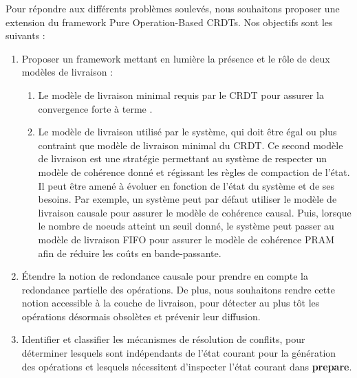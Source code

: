 Pour répondre aux différents problèmes soulevés, nous souhaitons proposer une extension du framework Pure Operation-Based \acp{CRDT}.
Nos objectifs sont les suivants :
\begin{enumerate}
    \item Proposer un framework mettant en lumière la présence et le rôle de deux modèles de livraison :
        \begin{enumerate}
            \item Le modèle de livraison minimal requis par le \ac{CRDT} pour assurer la convergence forte à terme \cite{shapiro_2011_crdt}.
            \item Le modèle de livraison utilisé par le système, qui doit être égal ou plus contraint que modèle de livraison minimal du \ac{CRDT}.
                Ce second modèle de livraison est une stratégie permettant au système de respecter un modèle de cohérence donné et régissant les règles de compaction de l'état.
                Il peut être amené à évoluer en fonction de l'état du système et de ses besoins.
                Par exemple, un système peut par défaut utiliser le modèle de livraison causale pour assurer le modèle de cohérence causal.
                Puis, lorsque le nombre de noeuds atteint un seuil donné, le système peut passer au modèle de livraison FIFO pour assurer le modèle de cohérence PRAM afin de réduire les coûts en bande-passante.
        \end{enumerate}
    \item Étendre la notion de redondance causale pour prendre en compte la redondance partielle des opérations.
        De plus, nous souhaitons rendre cette notion accessible à la couche de livraison, pour détecter au plus tôt les opérations désormais obsolètes et prévenir leur diffusion.
    \item Identifier et classifier les mécanismes de résolution de conflits, pour déterminer lesquels sont indépendants de l'état courant pour la génération des opérations et lesquels nécessitent d'inspecter l'état courant dans \textbf{prepare}.
\end{enumerate}
